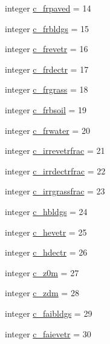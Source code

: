\begin{DoxyCompactItemize}
\item 
integer \hyperlink{namespacecolnamesinputfiles_a2f12104ba45c0ff7053d2d7f851ed000}{c\+\_\+frpaved} = 14
\item 
integer \hyperlink{namespacecolnamesinputfiles_a7868294c7f97248046b0a6047dd4f753}{c\+\_\+frbldgs} = 15
\item 
integer \hyperlink{namespacecolnamesinputfiles_a565e5f16a20642fda72028b34cb88bb3}{c\+\_\+frevetr} = 16
\item 
integer \hyperlink{namespacecolnamesinputfiles_a1ebacc2fbd10cdf035cf02a06f33c944}{c\+\_\+frdectr} = 17
\item 
integer \hyperlink{namespacecolnamesinputfiles_ac80dd753bc392e8f2439fcca47c72354}{c\+\_\+frgrass} = 18
\item 
integer \hyperlink{namespacecolnamesinputfiles_abc5659ccd0e939172ca714548673744e}{c\+\_\+frbsoil} = 19
\item 
integer \hyperlink{namespacecolnamesinputfiles_a0bc8de048554a16cdf597d25115bbfce}{c\+\_\+frwater} = 20
\item 
integer \hyperlink{namespacecolnamesinputfiles_a469c588da4e0ea1e93f676a96c2b3f0d}{c\+\_\+irrevetrfrac} = 21
\item 
integer \hyperlink{namespacecolnamesinputfiles_a9ed1b8e9314a06c21406c39846ac6b62}{c\+\_\+irrdectrfrac} = 22
\item 
integer \hyperlink{namespacecolnamesinputfiles_ad67f646a9794ac7f54a585a7f2d7b8d8}{c\+\_\+irrgrassfrac} = 23
\item 
integer \hyperlink{namespacecolnamesinputfiles_a0a459714bacb89b022263b1964a22404}{c\+\_\+hbldgs} = 24
\item 
integer \hyperlink{namespacecolnamesinputfiles_a79064204a1b04b9ab7750b534ca759fe}{c\+\_\+hevetr} = 25
\item 
integer \hyperlink{namespacecolnamesinputfiles_a37ecd1e64187c3e98ac5e4d4c08e1180}{c\+\_\+hdectr} = 26
\item 
integer \hyperlink{namespacecolnamesinputfiles_a62828c78b2fe19453ad737c07573f84f}{c\+\_\+z0m} = 27
\item 
integer \hyperlink{namespacecolnamesinputfiles_a74c3c42fe4df332569127f74ce478491}{c\+\_\+zdm} = 28
\item 
integer \hyperlink{namespacecolnamesinputfiles_a876e123c3e15a3a07545672dc4bfafe4}{c\+\_\+faibldgs} = 29
\item 
integer \hyperlink{namespacecolnamesinputfiles_acfe649c237ebb0719e7397cfaf736d72}{c\+\_\+faievetr} = 30
\item 

\end{DoxyCompactItemize}
